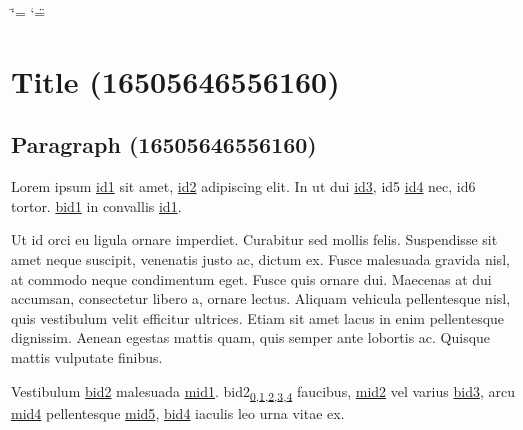 

\ifdefined\shorthandoff
  \ifnum\catcode`\=\string=\active\shorthandoff{=}\fi
  \ifnum\catcode`\"=\active{}\fi
\fi

\pagestyle{empty}
\sphinxmaketitle
\pagestyle{plain}
\sphinxtableofcontents
\pagestyle{normal}
\label{\detokenize{index::doc}}


\sphinxstepscope


\chapter{Title (16505646556160)}
\label{\detokenize{test:title-16505646556160}}\label{\detokenize{test::doc}}

\section{Paragraph (16505646556160)}
\label{\detokenize{test:paragraph-16505646556160}}
\sphinxAtStartPar
Lorem ipsum \hyperlink{\detokenize{id1}}{id1} sit amet, \hyperlink{\detokenize{id2}}{id2} adipiscing elit. In ut dui
\hyperlink{\detokenize{id3}}{id3}, \hypertarget{\detokenize{id5}}{id5} \hyperlink{\detokenize{id4}}{id4} nec,
\hypertarget{\detokenize{id6}}{id6} tortor. \hyperlink{\detokenize{bid1}}{\hypertarget{\detokenize{bid1-ref4}}{bid1}} in convallis \hyperlink{\detokenize{id1}}{id1}.

\sphinxAtStartPar
Ut id orci eu ligula ornare imperdiet. Curabitur sed mollis felis. Suspendisse sit amet neque
suscipit, venenatis justo ac, dictum ex. Fusce malesuada gravida nisl, at commodo neque condimentum
eget. Fusce quis ornare dui. Maecenas at dui accumsan, consectetur libero a, ornare lectus. Aliquam
vehicula pellentesque nisl, quis vestibulum velit efficitur ultrices. Etiam sit amet lacus in enim
pellentesque dignissim. Aenean egestas mattis quam, quis semper ante lobortis ac. Quisque mattis
vulputate finibus.

\sphinxAtStartPar
Vestibulum \hyperlink{\detokenize{bid2}}{\hypertarget{\detokenize{bid2-ref6}}{bid2}} malesuada \hyperlink{\detokenize{test-mid1-id1}}{\hypertarget{\detokenize{test-mid1-id0}}{mid1}}.
\hypertarget{\detokenize{bid2}}{bid2}\texorpdfstring{\textsubscript{\hyperlink{\detokenize{bid2-ref6}}{0},\hyperlink{\detokenize{bid2-ref15}}{1},\hyperlink{\detokenize{bid2-ref21}}{2},\hyperlink{\detokenize{bid2-ref29}}{3},\hyperlink{\detokenize{bid2-ref39}}{4}}}{} faucibus, \hyperlink{\detokenize{test-mid2-id1}}{\hypertarget{\detokenize{test-mid2-id0}}{mid2}} vel varius \hyperlink{\detokenize{bid3}}{\hypertarget{\detokenize{bid3-ref7}}{bid3}},
arcu \hyperlink{\detokenize{test-mid4-id1}}{\hypertarget{\detokenize{test-mid4-id0}}{mid4}} pellentesque \hyperlink{\detokenize{test-mid5-id1}}{\hypertarget{\detokenize{test-mid5-id0}}{mid5}},
\hyperlink{\detokenize{bid4}}{\hypertarget{\detokenize{bid4-ref8}}{bid4}} iaculis leo urna vitae ex.

